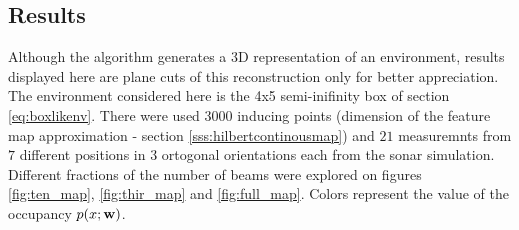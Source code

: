 \subsection{Results}

Although the algorithm generates a 3D representation of an environment, results
displayed here are plane cuts of this reconstruction only for better
appreciation. The environment considered here is the 4x5 semi-inifinity box of
section \ref{eq:boxlikenv}. There were used $3000$ inducing points (dimension of
the feature map approximation - section \ref{sss:hilbertcontinousmap}) and $21$
measuremnts from $7$ different positions in $3$ ortogonal orientations each
from the sonar simulation. Different fractions of the number of beams were
explored on figures \ref{fig:ten_map}, \ref{fig:thir_map} and
\ref{fig:full_map}. Colors represent the value of the occupancy
$p(x;\mathrm{\mathbf{w}})$.

